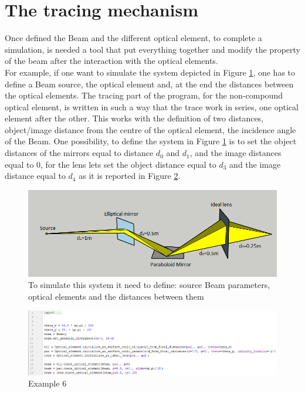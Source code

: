 \section{The tracing mechanism}
Once defined the Beam and the different optical element, to complete a simulation, is needed a tool that put everything together and modify the property of the beam after the interaction with the optical elements.
\\
For example, if one want to simulate the system depicted in Figure \ref{fig: System}, one has to define a Beam source, the optical element and, at the end the distances between the optical elements. The tracing part of the program, for the non-compound optical element, is written in such a way that the trace work in series, one optical element after the other. This works with the definition of two distances, object/image distance from the centre  of the optical element, the incidence angle of the Beam. One possibility, to define the system in Figure \ref{fig: System} is to set the object distances of the mirrors equal to distance $d_0 $ and $d_1 $, and the image distances equal to $0 $, for the lens lets set the object distance equal to $d_3 $ and the image distance equal to $d_4 $ as it is reported in Figure \ref{fig: CodeSystem}.
\begin{figure}[H]
%
\centering
%
\includegraphics[width=1.0\textwidth]{Immagini/Chapter3/Cattura}
%
\caption{To simulate this system it need to define: source Beam parameters, optical elements and the distances between them}
%
\label{fig: System}
%
\end{figure}
\begin{figure}[H]
%
\centering
%
\includegraphics[width=1.\textwidth]{Immagini/Chapter3/CodeSystem}
%
\caption{Example 6}
%
\label{fig: CodeSystem}
%
\end{figure}
%
